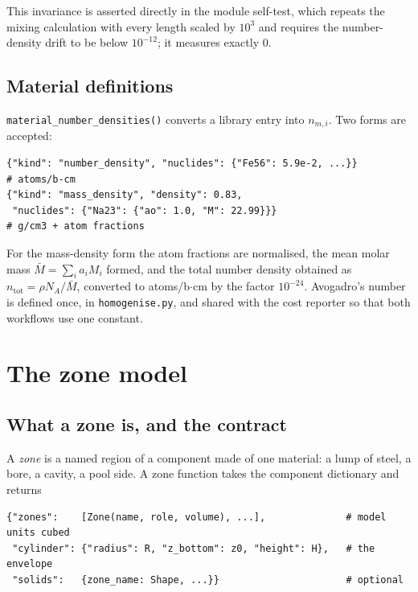 \documentclass[9pt,a4paper]{extarticle}
\newcommand{\code}[1]{\texttt{\small #1}}
\newcommand{\file}[1]{\texttt{\small #1}}
\begin{document}
This invariance is asserted directly in the module self-test, which repeats the
mixing calculation with every length scaled by $10^3$ and requires the
number-density drift to be below $10^{-12}$; it measures exactly $0$.

\subsection{Material definitions}

\code{material\_number\_densities()} converts a library entry into
$n_{m,i}$. Two forms are accepted:

\begin{lstlisting}[style=py]
{"kind": "number_density", "nuclides": {"Fe56": 5.9e-2, ...}}          # atoms/b-cm
{"kind": "mass_density", "density": 0.83,
 "nuclides": {"Na23": {"ao": 1.0, "M": 22.99}}}                        # g/cm3 + atom fractions
\end{lstlisting}

\noindent
For the mass-density form the atom fractions are normalised, the mean molar mass
$\bar{M}=\sum_i a_i M_i$ formed, and the total number density obtained as
$n_{\mathrm{tot}} = \rho N_A / \bar{M}$, converted to atoms/b$\cdot$cm by the
factor $10^{-24}$. Avogadro's number is defined once, in \file{homogenise.py},
and shared with the cost reporter so that both workflows use one constant.

\section{The zone model}

\subsection{What a zone is, and the contract}

A \emph{zone} is a named region of a component made of one material: a lump of
steel, a bore, a cavity, a pool side. A zone function takes the component
dictionary and returns

\begin{lstlisting}[style=py]
{"zones":    [Zone(name, role, volume), ...],              # model units cubed
 "cylinder": {"radius": R, "z_bottom": z0, "height": H},   # the envelope
 "solids":   {zone_name: Shape, ...}}                      # optional
\end{lstlisting}
\end{document}
